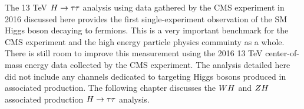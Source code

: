 The 13 TeV $H\to\tau\tau$ analysis using data gathered by the CMS experiment in 2016 discussed here provides the first 
single-experiment observation of the SM Higgs boson decaying to fermions. This is a very important benchmark for the CMS
experiment and the high energy particle physics commuinty as a whole. There is still room to improve this
measurement using the 2016 13 TeV center-of-mass energy data collected by the CMS experiment. The analysis
detailed here did not include any channels dedicated to targeting Higgs bosons produced in associated production.
The following chapter discusses the $WH$ and $ZH$ associated production $H\to\tau\tau$ analysis.


